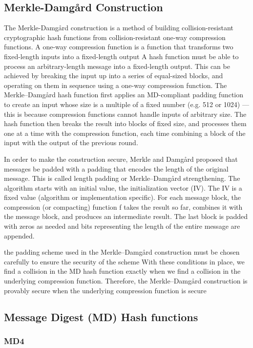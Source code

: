 \subsection{Merkle-Damg\aa rd Construction}
The Merkle-Damg\aa rd construction is 
a method of building collision-resistant cryptographic hash functions 
from collision-resistant one-way compression functions.
A one-way compression function is a function
that transforms two fixed-length inputs into a fixed-length output
A hash function must be able to process an arbitrary-length message into a fixed-length output.
This can be achieved by breaking the input up into a series of equal-sized blocks,
and operating on them in sequence using a one-way compression function.
The Merkle–Damgård hash function first applies an MD-compliant padding function to create an input whose size is a multiple of a fixed number (e.g. 512 or 1024) — this is because compression functions cannot handle inputs of arbitrary size. The hash function then breaks the result into blocks of fixed size, and processes them one at a time with the compression function, each time combining a block of the input with the output of the previous round.

In order to make the construction secure, Merkle and Damgård proposed that messages be padded with a padding that encodes the length of the original message. This is called length padding or Merkle–Damgård strengthening.
The algorithm starts with an initial value, the initialization vector (IV). The IV is a fixed value (algorithm or implementation specific). For each message block, the compression (or compacting) function f takes the result so far, combines it with the message block, and produces an intermediate result. The last block is padded with zeros as needed and bits representing the length of the entire message are appended.

the padding scheme used in the Merkle–Damgård construction must be chosen carefully to ensure the security of the scheme
With these conditions in place, we find a collision in the MD hash function exactly when we find a collision in the underlying compression function. Therefore, the Merkle–Damgård construction is provably secure when the underlying compression function is secure


\subsection{Message Digest (MD) Hash functions}

\subsubsection{MD4}

